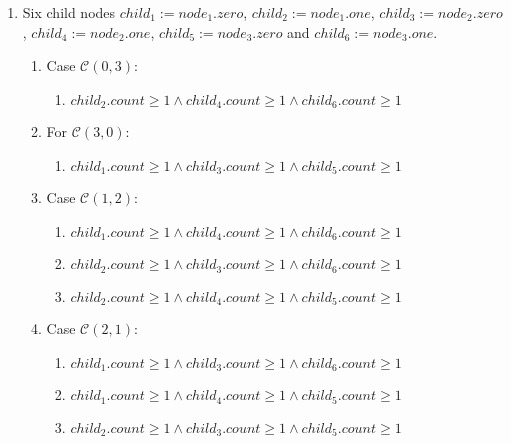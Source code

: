 \begin{enumerate}
        \begin{enumerate}
            \item Six child nodes $child_{1} := node_{1}.zero$, $child_{2} := node_{1}.one$, $child_{3} := node_{2}.zero$, $child_{4} := node_{2}.one$, $child_{5} := node_{3}.zero$ and $child_{6} := node_{3}.one$.

            \begin{enumerate}
                \item Case $\mathcal{C}\left(0,3\right)$:
                    \begin{enumerate}
                        \item $child_{2}.count \geq 1 \wedge child_{4}.count \geq 1 \wedge child_{6}.count \geq 1$
                    \end{enumerate}
                \item For $\mathcal{C}\left(3,0\right)$:
                    \begin{enumerate}
                        \item $child_{1}.count \geq 1 \wedge child_{3}.count \geq 1 \wedge child_{5}.count \geq 1$
                    \end{enumerate}
        
                \item Case $\mathcal{C}\left(1,2\right)$:
                    \begin{enumerate}
                        \item $child_{1}.count \geq 1 \wedge child_{4}.count \geq 1 \wedge child_{6}.count \geq 1$
                        \item $child_{2}.count \geq 1 \wedge child_{3}.count \geq 1 \wedge child_{6}.count \geq 1$
                        \item $child_{2}.count \geq 1 \wedge child_{4}.count \geq 1 \wedge child_{5}.count \geq 1$
                    \end{enumerate}
                \item Case $\mathcal{C}\left(2,1\right)$:
                    \begin{enumerate}
                        \item $child_{1}.count \geq 1 \wedge child_{3}.count \geq 1 \wedge child_{6}.count \geq 1$
                        \item $child_{1}.count \geq 1 \wedge child_{4}.count \geq 1 \wedge child_{5}.count \geq 1$
                        \item $child_{2}.count \geq 1 \wedge child_{3}.count \geq 1 \wedge child_{5}.count \geq 1$
                    \end{enumerate}
            \end{enumerate}
        \end{enumerate}

\label{enum:nsCcases}
\end{enumerate}


